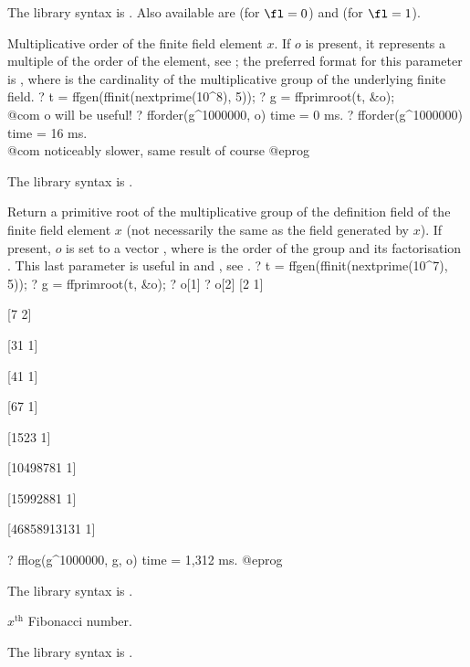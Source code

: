 The library syntax is .
Also available are
  (for $\fl=0$)
 and  (for $\fl=1$).

\label{se:fforder}
Multiplicative order of the finite field element $x$.  If $o$ is
present, it represents a multiple of the order of the element,
see ; the preferred format for
this parameter is \kbd{[N, factor(N)]}, where  is the cardinality
of the multiplicative group of the underlying finite field.
\bprog
? t = ffgen(ffinit(nextprime(10^8), 5));
? g = ffprimroot(t, &o);  \\@com o will be useful!
? fforder(g^1000000, o)
time = 0 ms.
? fforder(g^1000000)
time = 16 ms. \\@com noticeably slower, same result of course
@eprog

The library syntax is .

\label{se:ffprimroot}
Return a primitive root of the multiplicative
group of the definition field of the finite field element $x$ (not necessarily
the same as the field generated by $x$). If present, $o$ is set to
a vector \kbd{[ord, fa]}, where  is the order of the group
and  its factorisation . This last parameter is
useful in  and , see .
\bprog
? t = ffgen(ffinit(nextprime(10^7), 5));
? g = ffprimroot(t, &o);
? o[1]
? o[2]
[2 1]

[7 2]

[31 1]

[41 1]

[67 1]

[1523 1]

[10498781 1]

[15992881 1]

[46858913131 1]

? fflog(g^1000000, g, o)
time = 1,312 ms.
@eprog

The library syntax is .

\label{se:fibonacci}
$x^{\text{th}}$ Fibonacci number.

The library syntax is .


